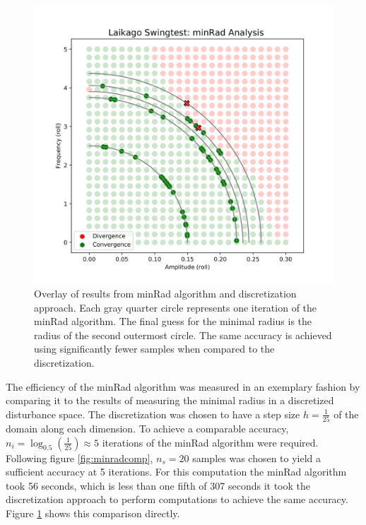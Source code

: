     
    \begin{figure}
    \centering
    \includegraphics[width=.5\linewidth]{figures/minrad_analysis_v2.png}
    \caption[minRad Result Analysis]{Overlay of results from minRad algorithm and discretization approach. Each gray quarter circle represents one iteration of the minRad algorithm. The final guess for the minimal radius is the radius of the second outermost circle. The same accuracy is achieved using significantly fewer samples when compared to the discretization.}
    \label{fig:minradanal}
    \end{figure}

    The efficiency of the minRad algorithm was measured in an exemplary fashion by comparing it to the results of measuring the minimal radius in a discretized disturbance space. The discretization was chosen to have a step size $h =\frac{1}{25}$ of the domain along each dimension. To achieve a comparable accuracy, $n_{i} = \log_{0.5}(\frac{1}{25}) \approx 5$ iterations of the minRad algorithm were required. Following figure \ref{fig:minradcomp}, $n_s = 20$ samples was chosen to yield a sufficient accuracy at 5 iterations. For this computation the minRad algorithm took 56 seconds, which is less than one fifth of 307 seconds it took the discretization approach to perform computations to achieve the same accuracy. Figure \ref{fig:minradanal} shows this comparison directly. 

    

